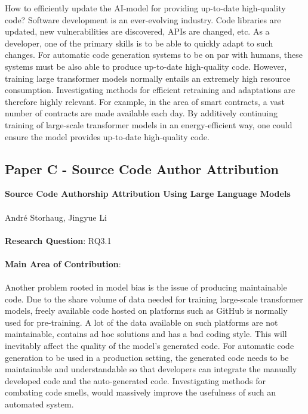 \documentclass{article}
\begin{document}
How to efficiently update the AI-model for providing up-to-date high-quality code?
Software development is an ever-evolving industry. Code libraries are updated, new vulnerabilities are discovered, APIs are changed, etc. As a developer, one of the primary skills is to be able to quickly adapt to such changes. For automatic code generation systems to be on par with humans, these systems must be also able to produce up-to-date high-quality code. However, training large transformer models normally entails an extremely high resource consumption. Investigating methods for efficient retraining and adaptations are therefore highly relevant. For example, in the area of smart contracts, a vast number of contracts are made available each day. By additively continuing training of large-scale transformer models in an energy-efficient way, one could ensure the model provides up-to-date high-quality code.

\subsection{Paper C - Source Code Author Attribution}

\textbf{Source Code Authorship Attribution Using Large Language Models}\\\\
\noindent Andr\'e Storhaug, Jingyue Li\\\\
\noindent \textbf{Research Question}: RQ3.1\\\\
\noindent \textbf{Main Area of Contribution}: \\\\

Another problem rooted in model bias is the issue of producing maintainable code. Due to the share volume of data needed for training large-scale transformer models, freely available code hosted on platforms such as GitHub is normally used for pre-training. A lot of the data available on such platforms are not maintainable, contains ad hoc solutions and has a bad coding style. This will inevitably affect the quality of the model's generated code. For automatic code generation to be used in a production setting, the generated code needs to be maintainable and understandable so that developers can integrate the manually developed code and the auto-generated code. Investigating methods for combating code smells, would massively improve the usefulness of such an automated system.
\end{document}

